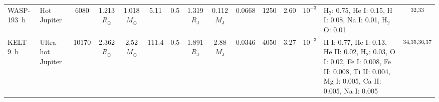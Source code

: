 \begin{landscape}
\begin{longtable}{llcccccccccccp{4.2cm}c}
WASP-193~b & Hot Jupiter & 6080 & 1.213 $R_\odot$ & 1.018 $M_\odot$ & 5.11 & 0.5 & 1.319 $R_\mathrm{J}$ & 0.112 $M_\mathrm{J}$ & $0.0668$ & 1250 & 2.60 & $10^{-3}$ & H$_{2}$: 0.75, He I: 0.15, H I: 0.08, Na I: 0.01, H$_{2}$O: 0.01 & \textsuperscript{32,33} \\
KELT-9~b & Ultra-hot Jupiter & 10170 & 2.362 $R_\odot$ & 2.52 $M_\odot$ & 111.4 & 0.5 & 1.891 $R_\mathrm{J}$ & 2.88 $M_\mathrm{J}$ & $0.0346$ & 4050 & 3.27 & $10^{-3}$ & H I: 0.77, He I: 0.13, He II: 0.02, H$_{2}$: 0.03, O I: 0.02, Fe I: 0.008, Fe II: 0.008, Ti II: 0.004, Mg I: 0.005, Ca II: 0.005, Na I: 0.005 & \textsuperscript{34,35,36,37} \\

\end{longtable}
\end{landscape}
